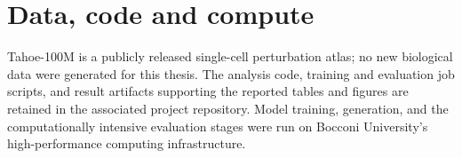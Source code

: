 \section*{Data, code and compute}

Tahoe-100M is a publicly released single-cell perturbation atlas; no new biological data were
generated for this thesis. The analysis code, training and evaluation job scripts, and result
artifacts supporting the reported tables and figures are retained in the associated project
repository. Model training, generation, and the computationally intensive evaluation stages were
run on Bocconi University's high-performance computing infrastructure.
